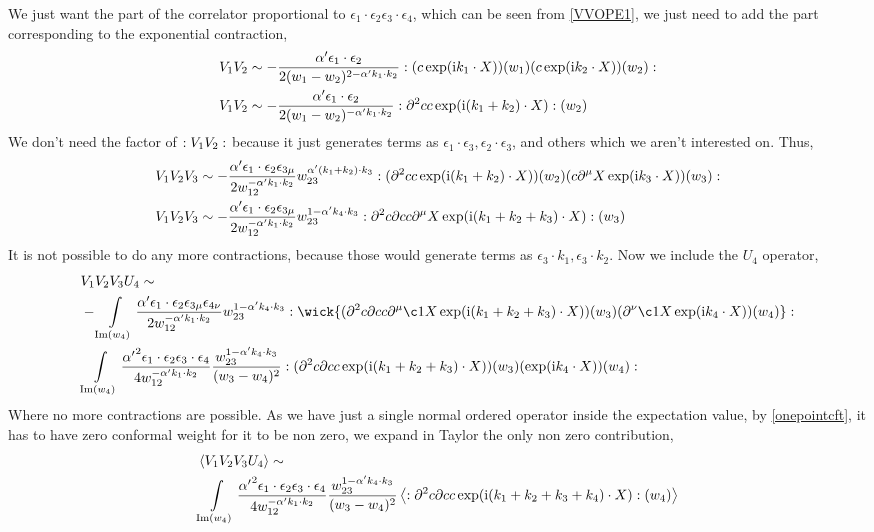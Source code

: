 We just want the part of the correlator proportional to $\epsilon_1\cdot\epsilon_2\epsilon_3\cdot \epsilon_4$, 
which can be seen from \cref{VVOPE1}, we just need to add the part corresponding to the exponential contraction,
\begin{align*}
    V_1V_2&\sim-\frac{\alpha'\epsilon_1\cdot\epsilon_2}{2(w_1-w_2)^{2-\alpha'k_1\cdot k_2}}:\qty(c\exp(\textnormal{i} k_1\cdot X))(w_1)\qty(c\exp(\textnormal{i} k_2\cdot X))(w_2):\\
    V_1V_2&\sim-\frac{\alpha'\epsilon_1\cdot\epsilon_2}{2(w_1-w_2)^{-\alpha'k_1\cdot k_2}}:\partial^2cc\exp(\textnormal{i}(k_1+ k_2)\cdot X):(w_2)
\end{align*}
We don't need the factor of $:V_1V_2:$ because it just generates terms as $\epsilon_1\cdot\epsilon_3,\epsilon_2\cdot\epsilon_3$, 
and others which we aren't interested on. Thus,
\begin{align*}
    V_1V_2V_3&\sim-\frac{\alpha'\epsilon_1\cdot\epsilon_2\epsilon_{3\mu}}{2w_{12}^{-\alpha'k_1\cdot k_2}}w_{23}^{\alpha' (k_1+k_2)\cdot k_3}:(\partial^2cc\exp(\textnormal{i}(k_1+ k_2)\cdot X))(w_2)\qty(c\partial^\mu X\exp(\textnormal{i} k_3\cdot X))(w_3):\\
    V_1V_2V_3&\sim-\frac{\alpha'\epsilon_1\cdot\epsilon_2\epsilon_{3\mu}}{2w_{12}^{-\alpha'k_1\cdot k_2}}w_{23}^{1-\alpha' k_4\cdot k_3}:\partial^2c\partial cc\partial^\mu X\exp(\textnormal{i}(k_1+k_2+ k_3)\cdot X):(w_3)
\end{align*}
It is not possible to do any more contractions, because those would generate terms as $\epsilon_3\cdot k_1,\epsilon_3\cdot k_2$. 
Now we include the $U_4$ operator,
\begin{align*}
    &V_1V_2V_3U_4\sim\\
    &-\int\limits_{\textnormal{Im}(w_4)}\frac{\alpha'\epsilon_1\cdot\epsilon_2\epsilon_{3\mu}\epsilon_{4\nu}}{2w_{12}^{-\alpha'k_1\cdot k_2}}w_{23}^{1-\alpha' k_4\cdot k_3}\cnord{\wick{(\partial^2c\partial cc\partial^\mu\c1 X\exp(\im(k_1+k_2+ k_3)\cdot X))(w_3)(\partial^\nu\c1 X\exp(\im k_4\cdot X))(w_4)}}\\
    &\int\limits_{\textnormal{Im}(w_4)}\frac{{\alpha'}^2\epsilon_1\cdot\epsilon_2\epsilon_{3}\cdot\epsilon_{4}}{4w_{12}^{-\alpha'k_1\cdot k_2}}\frac{w_{23}^{1-\alpha' k_4\cdot k_3}}{(w_3-w_4)^2}\cnord{{(\partial^2c\partial cc\exp(\im(k_1+k_2+ k_3)\cdot X))(w_3)(\exp(\im k_4\cdot X))(w_4)}}
\end{align*}
Where no more contractions are possible. As we have just a single normal ordered operator inside the expectation value, by \cref{onepointcft}, it has to have zero 
conformal weight for it to be non zero, we expand in Taylor the only non zero contribution,
\begin{align*}
    &\expval{V_1V_2V_3U_4}\sim\\
    &\int\limits_{\textnormal{Im}(w_4)}\frac{{\alpha'}^2\epsilon_1\cdot\epsilon_2\epsilon_{3}\cdot\epsilon_{4}}{4w_{12}^{-\alpha'k_1\cdot k_2}}\frac{w_{23}^{1-\alpha' k_4\cdot k_3}}{(w_3-w_4)^2}\expval{:{\partial^2c\partial cc\exp(\textnormal{i}(k_1+k_2+ k_3+k_4)\cdot X)}:(w_4)}
\end{align*}